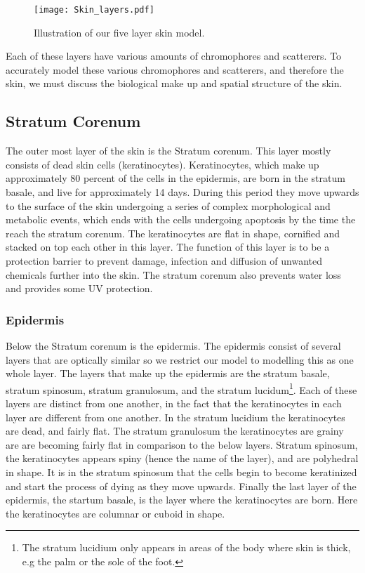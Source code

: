 \begin{figure}[!htpb]
    \centering
    \texttt{[image: Skin\_layers.pdf]}
    \caption{Illustration of our five layer skin model.}
    \label{fig:skinexample}
\end{figure}

Each of these layers have various amounts of chromophores and scatterers.
To accurately model these various chromophores and scatterers, and therefore the skin, we must discuss the biological make up and spatial structure of the skin.

\subsection*{Stratum Corenum} %
\label{sub:stratum}

The outer most layer of the skin is the Stratum corenum.
This layer mostly consists of dead skin cells (keratinocytes).
Keratinocytes, which make up approximately 80 percent of the cells in the epidermis, are born in the stratum basale, and live for approximately 14 days.
During this period they move upwards to the surface of the skin undergoing a series of complex morphological and metabolic events, which ends with the cells undergoing apoptosis by the time the reach the stratum corenum.
The keratinocytes are flat in shape, cornified and stacked on top each other in this layer.
The function of this layer is to be a protection barrier to prevent damage, infection and diffusion of unwanted chemicals further into the skin.
The stratum corenum also prevents water loss and provides some UV protection.


\subsubsection*{Epidermis} %
\label{ssub:epidermis}

Below the Stratum corenum is the epidermis.
The epidermis consist of several layers that are optically similar so we restrict our model to modelling this as one whole layer.
The layers that make up the epidermis are the stratum basale, stratum spinosum, stratum granulosum, and the stratum lucidum\footnote{The stratum lucidium only appears in areas of the body where skin is thick, e.g the palm or the sole of the foot.}.
Each of these layers are distinct from one another, in the fact that the keratinocytes in each layer are different from one another.
In the stratum lucidium the keratinocytes are dead, and fairly flat.
The stratum granulosum the keratinocytes are grainy are are becoming fairly flat in comparison to the below layers.
Stratum spinosum, the keratinocytes appears spiny (hence the name of the layer), and are polyhedral in shape.
It is in the stratum spinosum that the cells begin to become keratinized and start the process of dying as they move upwards.
Finally the last layer of the epidermis, the startum basale, is the layer where the keratinocytes are born.
Here the keratinocytes are columnar or cuboid in shape.

